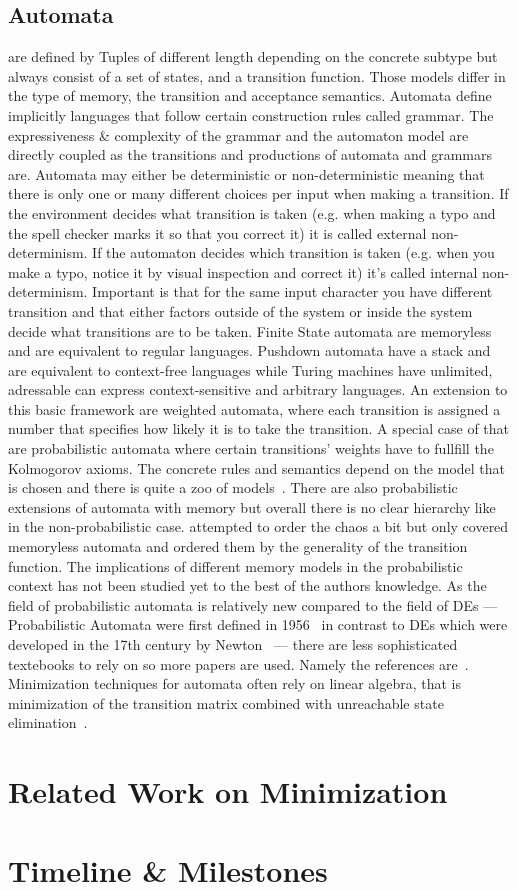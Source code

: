\documentclass[11pt, rgb]{scrartcl}
\begin{document}
\subsection{Automata} are defined by Tuples of different length depending on the concrete subtype but always consist of a set of states, and a transition function. Those models differ in the type of memory, the transition and acceptance semantics. Automata define implicitly languages that follow certain construction rules called grammar. The expressiveness \& complexity of the grammar and the automaton model are directly coupled as the transitions and productions of automata and grammars are. Automata may either be deterministic or non-deterministic meaning that there is only one or many different choices per input when making a transition. If the environment decides what transition is taken (e.g. when making a typo and the spell checker marks it so that you correct it) it is called external non-determinism. If the automaton decides which transition is taken (e.g. when you make a typo, notice it by visual inspection and correct it) it's called internal non-determinism. Important is that for the same input character you have different transition and that either factors outside of the system or inside the system decide what transitions are to be taken. Finite State automata are memoryless and are equivalent to regular languages. Pushdown automata have a stack and are equivalent to context-free languages while Turing machines have unlimited, adressable can express context-sensitive and arbitrary languages. An extension to this basic framework are weighted automata, where each transition is assigned a number that specifies how likely it is to take the transition. A special case of that are probabilistic automata where certain transitions' weights have to fullfill the Kolmogorov axioms. The concrete rules and semantics depend on the model that is chosen and there is quite a zoo of models~\autocite{sokolova}. There are also probabilistic extensions of automata with memory but overall there is no clear hierarchy like in the non-probabilistic case. \autocite{sokolova} attempted to order the chaos a bit but only covered memoryless automata and ordered them by the generality of the transition function. The implications of different memory models in the probabilistic context has not been studied yet to the best of the authors knowledge. As the field of probabilistic automata is relatively new compared to the field of DEs --- Probabilistic Automata were first defined in 1956~\autocite{automatastudies} in contrast to DEs which were developed in the 17th century by Newton~\autocite{newton} --- there are less sophisticated textebooks to rely on so more papers are used. Namely the references are~\cite{sokolova, automatastudies, ppat, ata, hwa, paz, wolf, stoelinga, survey, patypes, pg, rpga, stochsysI, stochsysII, rabin}. Minimization techniques for automata often rely on linear algebra, that is minimization of the transition matrix combined with unreachable state elimination~\autocite{schutz}.

\section{Related Work on Minimization}


\nocite{*}
\printbibliography

\appendix

\section{Timeline \& Milestones}
\end{document}
